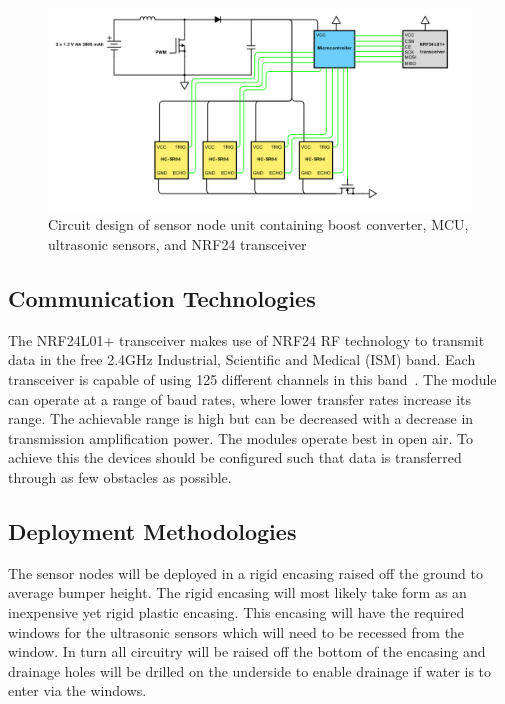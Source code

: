 \documentclass[10pt,twocolumn]{witseiepaper}
\begin{document}
		\begin{figure}
			\centering
			\includegraphics[scale=0.4]{media/node-circuit.png}
			\caption{Circuit design of sensor node unit containing boost converter, MCU, ultrasonic sensors, and NRF24 transceiver}
			\raggedright
			\label{fig:node-circuit}
		\end{figure}
	
	\subsection{Communication Technologies}
		The NRF24L01+ transceiver makes use of NRF24 RF technology to transmit data in the free 2.4GHz Industrial, Scientific and Medical (ISM) band. Each transceiver is capable of using 125 different channels in this band~\cite{howToMech_NRF24L01Tutorial}. The module can operate at a range of baud rates, where lower transfer rates increase its range. The achievable range is high but can be decreased with a decrease in transmission amplification power. The modules operate best in open air. To achieve this the devices should be configured such that data is transferred through as few obstacles as possible. 
		
	
	\subsection{Deployment Methodologies}
		The sensor nodes will be deployed in a rigid encasing raised off the ground to average bumper height. The rigid encasing will most likely take form as an inexpensive yet rigid plastic encasing. This encasing will have the required windows for the ultrasonic sensors which will need to be recessed from the window. In turn all circuitry will be raised off the bottom of the encasing and drainage holes will be drilled on the underside to enable drainage if water is to enter via the windows.
		
\end{document}
